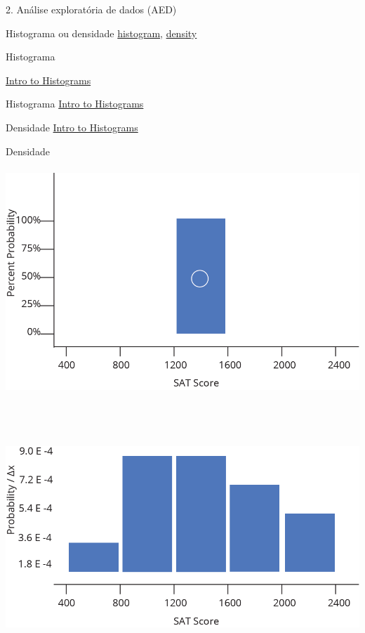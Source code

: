 \documentclass[
  ignorenonframetext,
]{beamer}
\begin{document}
\begin{frame}[fragile]{2. Análise exploratória de dados (AED)}
\begin{block}{Histograma ou densidade}
\href{https://www.data-to-viz.com/graph/histogram.html}{histogram},
\href{https://www.data-to-viz.com/graph/density.html}{density}
\end{block}

\begin{block}{Histograma}
\protect\hypertarget{histograma}{}
\pause

\href{https://plotly.com/chart-studio-help/histogram/}{Intro to
Histograms}
\end{block}

\begin{block}{Histograma}
\protect\hypertarget{histograma-1}{}
\href{https://plotly.com/chart-studio-help/histogram/}{Intro to
Histograms}
\end{block}

\begin{block}{Densidade}
\protect\hypertarget{densidade}{}
\href{https://plotly.com/chart-studio-help/histogram/}{Intro to
Histograms}
\end{block}

\begin{block}{Densidade}
\protect\hypertarget{densidade-1}{}
\includegraphics[width=5.72917in,height=3.64583in]{img/hist_fig6.gif}

\pause

\includegraphics[width=5.83333in,height=3.54167in]{img/hist_fig7.gif}


\end{block}
\end{frame}
\end{document}
